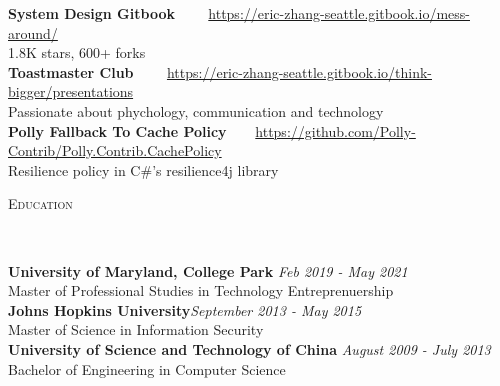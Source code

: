 \documentclass[3pt]{article}
\newenvironment{changemargin}[2]{%
  \begin{list}{}{%
    \setlength{\topsep}{0pt}%
    \setlength{\leftmargin}{#1}%
    \setlength{\rightmargin}{#2}%
    \setlength{\listparindent}{\parindent}%
    \setlength{\itemindent}{\parindent}%
    \setlength{\parsep}{\parskip}%
  }%
  \item[]}{\end{list}
}
\newcommand{\lineover}{
	\begin{changemargin}{-0.05in}{-0.05in}
		\vspace*{-8pt}
		\hrulefill \\
		\vspace*{-2pt}
	\end{changemargin}
}
\newcommand{\header}[1]{
	\begin{changemargin}{-0.5in}{-0.5in}
		{\Large \scshape{#1}}\\
  	\lineover
	\end{changemargin}
}
\newenvironment{body} {
	\vspace*{-16pt}
	\begin{changemargin}{-0.25in}{-0.5in}
  }	
	{\end{changemargin}
}
\begin{document}
\begin{body}
	\vspace{17pt}
	\textbf{System Design Gitbook} \hfill \href{https://eric-zhang-seattle.gitbook.io/mess-around/}{$\begin{array}{l}\end{array} \hspace{15pt}$https://eric-zhang-seattle.gitbook.io/mess-around/}\\
	1.8K stars, 600+ forks\\
  \smallskip
	\textbf{Toastmaster Club} \hfill \href{https://eric-zhang-seattle.gitbook.io/think-bigger/presentations}{$\begin{array}{l}\end{array} \hspace{15pt}$https://eric-zhang-seattle.gitbook.io/think-bigger/presentations}\\
	Passionate about phychology,  communication and technology\\
 \smallskip
	\textbf{Polly Fallback To Cache Policy}{}\hfill \href{https://github.com/Polly-Contrib/Polly.Contrib.CachePolicy}{$\begin{array}{l}\end{array} \hspace{15pt}$https://github.com/Polly-Contrib/Polly.Contrib.CachePolicy}\\
		Resilience policy in C\#'s resilience4j library \hfill \\
\end{body}

\bigskip

\header{Education}

\begin{body}
	\vspace{17pt}
	\textbf{University of Maryland, College Park} \hfill \emph{Feb 2019 - May 2021} \\
	Master of Professional Studies in Technology Entreprenuership \\
  \smallskip
	\textbf{Johns Hopkins University}{}\hfill \emph{September 2013 - May 2015}{} \\
	Master of Science in Information Security \hfill \\
  \smallskip
	\textbf{University of Science and Technology of China} \hfill \emph{August 2009 - July 2013} \\
	Bachelor of Engineering in Computer Science \\
\end{body}
\end{document}
